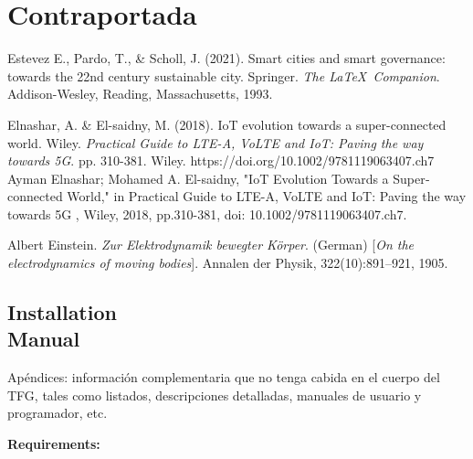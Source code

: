 \documentclass[12pt, a4paper, twoside]{article}
\begin{document}
\section{Contraportada}
\begin{thebibliography}{9}
Estevez E., Pardo, T., \& Scholl, J. (2021).
Smart cities and smart governance: towards the 22nd century sustainable city. Springer.
  \textit{The \LaTeX\ Companion}. 
  Addison-Wesley, Reading, Massachusetts, 1993.

Elnashar, A. \& El-saidny, M. (2018). 
IoT evolution towards a super-connected world. Wiley.
  \textit{Practical Guide to LTE-A, VoLTE and IoT: Paving the way towards 5G}. pp. 310-381. 
  Wiley. https://doi.org/10.1002/9781119063407.ch7
  Ayman Elnashar; Mohamed A. El-saidny, "IoT Evolution Towards a Super‐connected World," in Practical Guide to LTE-A, VoLTE and IoT: Paving the way towards 5G , Wiley, 2018, pp.310-381, doi: 10.1002/9781119063407.ch7.

  
  Albert Einstein. 
  \textit{Zur Elektrodynamik bewegter K{\"o}rper}. (German) 
  [\textit{On the electrodynamics of moving bodies}]. 
  Annalen der Physik, 322(10):891–921, 1905.

\end{thebibliography}

\newpage

\begin{umaappendices}
\section{Installation \\ Manual}
Apéndices: información complementaria que no tenga cabida en el cuerpo del TFG, tales como listados, descripciones detalladas, manuales de usuario y programador, etc. 
  
  \textbf{\large{Requirements:}}
  
  \blindtext

\end{umaappendices}
\end{document}
